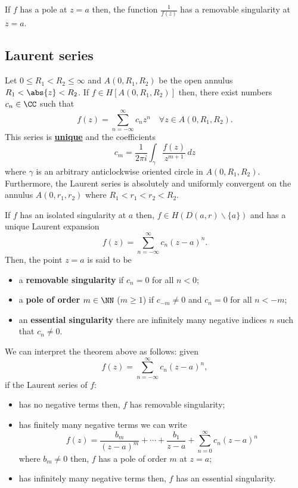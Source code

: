 \documentclass[12pt, a4paper]{article}
\begin{document}
\begin{corollary}
    If \(f\) has a pole at \(z=a\) then, the function \(\frac{1}{f(z)}\) has a removable singularity at \(z=a\).
\end{corollary}

\subsection{Laurent series}

\begin{theorem}
    Let \(0\leq R_1 < R_2 \leq \infty\) and \(A(0,R_1,R_2)\) be the open annulus \(R_1 < \abs{z} < R_2\). If \(f \in H[A(0,R_1,R_2)]\) then, there exist numbers \(c_n \in \CC\) such that 
    \[f(z) = \sum_{n=-\infty}^{\infty} c_n z^n \quad \forall z \in A(0,R_1,R_2).\]
    This series is \underline{\textbf{unique}} and the coefficients
    \[c_m = \frac{1}{2\pi i}\int_{\gamma} \frac{f(z)}{z^{m+1}} \, dz\]
    where \(\gamma\) is an arbitrary anticlockwise oriented circle in \(A(0,R_1,R_2)\). Furthermore, the Laurent series is absolutely and uniformly convergent on the annulus \(A(0,r_1,r_2)\) where \(R_1<r_1<r_2<R_2\).
\end{theorem}

\begin{mdprop}
    If \(f\) has an isolated singularity at \(a\) then, \(f\in H(D(a,r) \backslash \{a\})\) and has a unique Laurent expansion 
    \[f(z) = \sum_{n=-\infty}^{\infty} c_n(z-a)^n.\]
    Then, the point \(z=a\) is said to be
    \begin{itemize}
        \item a \textbf{removable singularity} if \(c_n =0\) for all \(n<0\);
        \item a \textbf{pole of order} \(m \in \NN\) (\(m\geq 1\)) if \(c_{-m} \neq 0\) and \(c_n =0\) for all \(n<-m\);
        \item an \textbf{essential singularity} there are infinitely many negative indices \(n\) such that \(c_n \neq 0\).
    \end{itemize}
\end{mdprop}

\begin{mdnote}
    We can interpret the theorem above as follows: given 
    \[f(z) = \sum_{n=-\infty}^{\infty} c_n(z-a)^n,\]
    if the Laurent series of \(f\):
    \begin{itemize}
        \item has no negative terms then, \(f\) has removable singularity;
        \item has finitely many negative terms we can write 
        \[f(z) = \frac{b_m}{(z-a)^m} + \cdots + \frac{b_1}{z-a} + \sum_{n=0}^{\infty} c_n (z-a)^n\]
        where \(b_m \neq 0\) then, \(f\) has a pole of order \(m\) at \(z=a\);
        \item has infinitely many negative terms then, \(f\) has an essential singularity.
    \end{itemize}
\end{mdnote}
\end{document}
